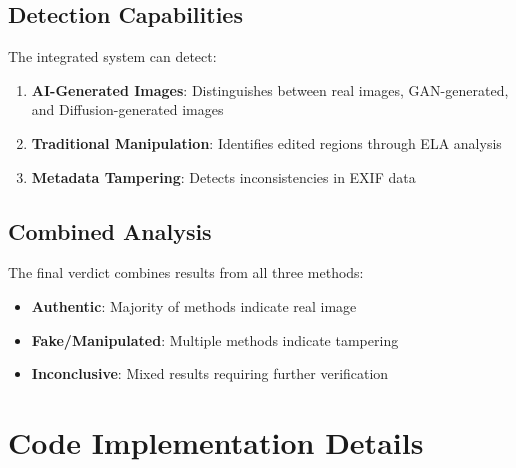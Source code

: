 \documentclass[12pt,a4paper]{article}
\begin{document}
\subsection{Detection Capabilities}
The integrated system can detect:

\begin{enumerate}
    \item \textbf{AI-Generated Images}: Distinguishes between real images, GAN-generated, and Diffusion-generated images
    \item \textbf{Traditional Manipulation}: Identifies edited regions through ELA analysis
    \item \textbf{Metadata Tampering}: Detects inconsistencies in EXIF data
\end{enumerate}

\subsection{Combined Analysis}
The final verdict combines results from all three methods:
\begin{itemize}
    \item \textbf{Authentic}: Majority of methods indicate real image
    \item \textbf{Fake/Manipulated}: Multiple methods indicate tampering
    \item \textbf{Inconclusive}: Mixed results requiring further verification
\end{itemize}

\section{Code Implementation Details}
\end{document}
